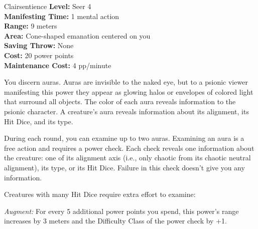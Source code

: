{Clairsentience}
{
	\textbf{Level:}
	Seer 4\\
	\textbf{Manifesting Time:}
	1 mental action\\
	\textbf{Range:}
	9 meters\\
	\textbf{Area:}
	Cone-shaped emanation centered on you\\
	\textbf{Saving Throw:}
	None\\
	\textbf{Cost:}
	20 power points\\
	\textbf{Maintenance Cost:}
	4 pp/minute\\
}
{
	You discern auras. Auras are invisible to the naked eye, but to a psionic viewer manifesting this power they appear as glowing halos or envelopes of colored light that surround all objects. The color of each aura reveals information to the psionic character. A creature's aura reveals information about its alignment, its Hit Dice, and its type.

	During each round, you can examine up to two auras. Examining an aura is a free action and requires a power check. Each check reveals one information about the creature: one of its alignment axis (i.e., only chaotic from its chaotic neutral alignment), its type, or its Hit Dice. Failure in this check doesn't give you any information.

	Creatures with many Hit Dice require extra effort to examine:


	\textit{Augment:} For every 5 additional power points you spend, this power's range increases by 3 meters and the Difficulty Class of the power check by +1.
}